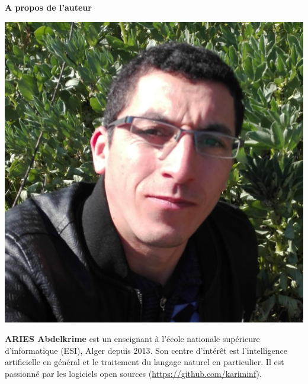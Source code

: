 \documentclass{KBook}
\begin{document}
\begin{tcolorbox}[colback=cyan,
	colframe=cyan,  
	arc=0pt,outer arc=0pt,
	valign=top, 
	halign=center,
	width=\textwidth]
	
	\color{white}
	\bfseries\LARGE A propos de l'auteur
	
\end{tcolorbox}\vspace{-.5cm}
\begin{tcolorbox}[colback=my-grey,
	colframe=my-grey,  
	center, arc=0pt,outer arc=0pt,
	valign=top, 
	halign=flush left,
	width=\textwidth]	
	
	\begin{minipage}[t]{0.15\textwidth}
		\includegraphics[width=\textwidth]{../img/aak.jpg}
	\end{minipage}
	\begin{minipage}[t]{0.01\textwidth}
	\end{minipage}
	\begin{minipage}[t]{0.80\textwidth}
		\normalsize\vspace*{-0.2\textwidth}
		\textbf{ARIES Abdelkrime} est un enseignant à l'école nationale supérieure d'informatique (ESI), Alger depuis 2013. 
		Son centre d'intérêt est l'intelligence artificielle en général et le traitement du langage naturel en particulier.
		Il est passionné par les logiciels open sources (\url{https://github.com/kariminf}).
		

\end{minipage}
\end{tcolorbox}
\end{document}
